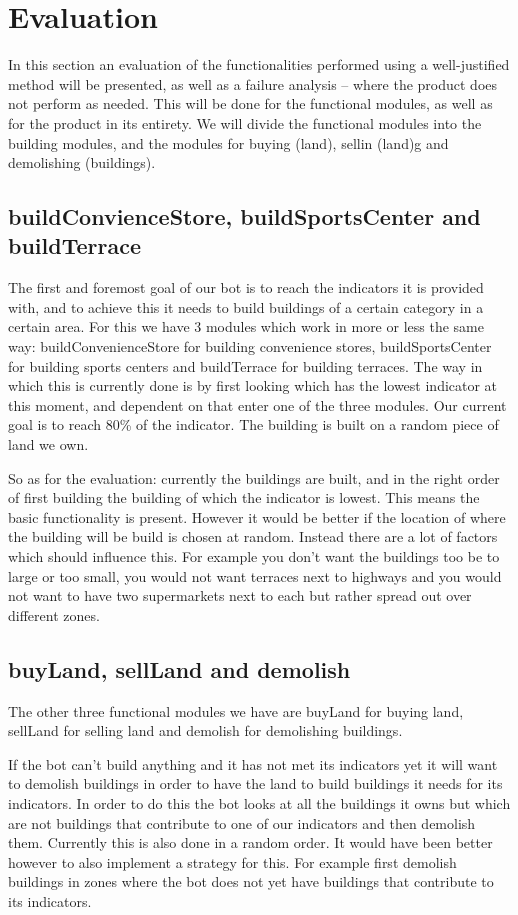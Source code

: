 \section{Evaluation}
In this section an evaluation of the functionalities performed using a well-justified method will be presented, as well as a failure analysis – where the product does not perform as needed. This will be done for the functional modules, as well as for the product in its entirety. We will divide the functional modules into the building modules, and the modules for buying (land), sellin (land)g and demolishing (buildings).
\subsection{buildConvienceStore, buildSportsCenter and buildTerrace}
The first and foremost goal of our bot is to reach the indicators it is provided with, and to achieve this it needs to build buildings of a certain category in a certain area. For this we have 3 modules which work in more or less the same way: buildConvenienceStore for building convenience stores, buildSportsCenter for building sports centers and buildTerrace for building terraces. The way in which this is currently done is by first looking which has the lowest indicator at this moment, and dependent on that enter one of the three modules. Our current goal is to reach 80\% of the indicator. The building is built on a random piece of land we own. 

So as for the evaluation: currently the buildings are built, and in the right order of first building the building of which the indicator is lowest. This means the basic functionality is present. However it would be better if the location of where the building will be build is chosen at random. Instead there are a lot of factors which should influence this. For example you don't want the buildings too be to large or too small, you would not want terraces next to highways and you would not want to have two supermarkets next to each but rather spread out over different zones.

\subsection{buyLand, sellLand and demolish}
The other three functional modules we have are buyLand for buying land, sellLand for selling land and demolish for demolishing buildings. 

If the bot can't build anything and it has not met its indicators yet it will want to demolish buildings in order to have the land to build buildings it needs for its indicators. In order to do this the bot looks at all the buildings it owns but which are not buildings that contribute to one of our indicators and then demolish them. Currently this is also done in a random order. It would have been better however to also implement a strategy for this. For example first demolish buildings in zones where the bot does not yet have buildings that contribute to its indicators. 

